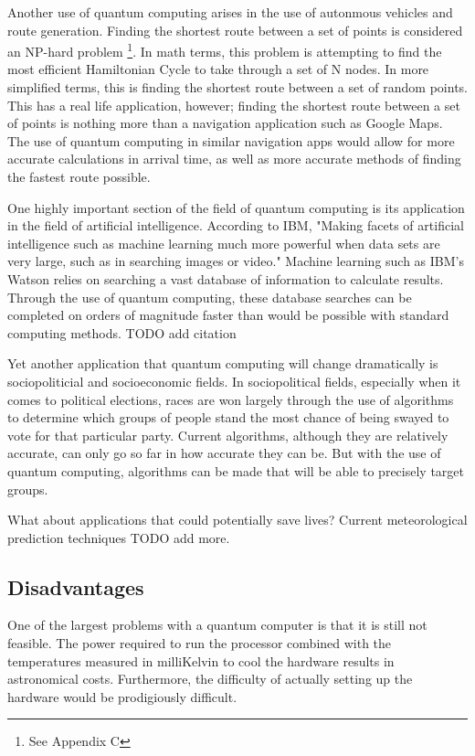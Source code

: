 \documentclass[10pt,journal,compsoc]{IEEEtran}
\begin{document}
Another use of quantum computing arises in the use of autonmous vehicles and route generation. Finding the shortest route between a set of points is considered an NP-hard problem
\footnote{See Appendix C }.
In math terms, this problem is attempting to find the most efficient Hamiltonian Cycle to take through a set of N nodes. In more simplified terms, this is finding the shortest route between a set of random points. This has a real life application, however; finding the shortest route between a set of points is nothing more than a navigation application such as Google Maps. The use of quantum computing in similar navigation apps would allow for more accurate calculations in arrival time, as well as more accurate methods of finding the fastest route possible. 
 
One highly important section of the field of quantum computing is its application in the field of artificial intelligence. According to IBM, "Making facets of artificial intelligence such as machine learning much more powerful when data sets are very large, such as in searching images or video." Machine learning such as IBM's Watson relies on searching a vast database of information to calculate results. Through the use of quantum computing, these database searches can be completed on orders of magnitude faster than would be possible with standard computing methods. TODO add citation

Yet another application that quantum computing will change dramatically is sociopoliticial and socioeconomic fields. In sociopolitical fields, especially when it comes to political elections, races are won largely through the use of algorithms to determine which groups of people stand the most chance of being swayed to vote for that particular party. Current algorithms, although they are relatively accurate, can only go so far in how accurate they can be. But with the use of quantum computing, algorithms can be made that will be able to precisely target groups. 

What about applications that could potentially save lives? Current meteorological prediction techniques
 TODO add more. 
\subsection{Disadvantages}
One of the largest problems with a quantum computer is that it is still not feasible. The power required to run the processor combined with the temperatures measured in milliKelvin to cool the hardware results in astronomical costs. Furthermore, the difficulty of actually setting up the hardware would be prodigiously difficult. 
\end{document}
